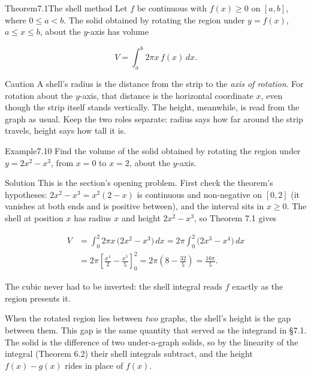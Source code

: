 \documentclass[a4paper,12pt,oneside]{memoir}
\begin{document}
\begin{envtheorem}{Theorem}{7.1}{The shell method}
Let \(f\) be continuous with \(f(x) \ge 0\) on \([a, b]\), where \(0 \le a < b\). The solid obtained by rotating the region under \(y = f(x)\), \(a \le x \le b\), about the \(y\)-axis has volume

\[ V = \int_{a}^{b} 2\pi x\,f(x)\,dx. \]
\end{envtheorem}
\begin{envcaution}{Caution}{}{}
A shell’s radius is the distance from the strip to the \emph{axis of rotation}. For rotation about the \(y\)-axis, that distance is the horizontal coordinate \(x\), even though the strip itself stands vertically. The height, meanwhile, is read from the graph as usual. Keep the two roles separate: radius says how far around the strip travels, height says how tall it is.
\end{envcaution}
\begin{workedexample}
\begin{envexample}{Example}{7.10}{}
Find the volume of the solid obtained by rotating the region under \(y = 2x^{2} - x^{3}\), from \(x = 0\) to \(x = 2\), about the \(y\)-axis.
\end{envexample}
\begin{envsolution}{Solution}{}{}
This is the section’s opening problem. First check the theorem’s hypotheses: \(2x^{2} - x^{3} = x^{2}(2 - x)\) is continuous and non-negative on \([0, 2]\) (it vanishes at both ends and is positive between), and the interval sits in \(x \ge 0\). The shell at position \(x\) has radius \(x\) and height \(2x^{2} - x^{3}\), so Theorem 7.1 gives

\[ \begin{aligned}
          V &= \int_{0}^{2} 2\pi x\,\bigl(2x^{2} - x^{3}\bigr)\,dx = 2\pi \int_{0}^{2} \bigl(2x^{3} - x^{4}\bigr)\,dx \\[2pt]
            &= 2\pi \left[\frac{x^{4}}{2} - \frac{x^{5}}{5}\right]_{0}^{2} = 2\pi\left(8 - \frac{32}{5}\right) = \frac{16\pi}{5}.
        \end{aligned} \]

The cubic never had to be inverted: the shell integral reads \(f\) exactly as the region presents it. \qedmark
\end{envsolution}
\end{workedexample}
When the rotated region lies between \emph{two} graphs, the shell’s height is the gap between them. This gap is the same quantity that served as the integrand in §7.1. The solid is the difference of two under-a-graph solids, so by the linearity of the integral (Theorem 6.2) their shell integrals subtract, and the height \(f(x) - g(x)\) rides in place of \(f(x)\).
\end{document}
